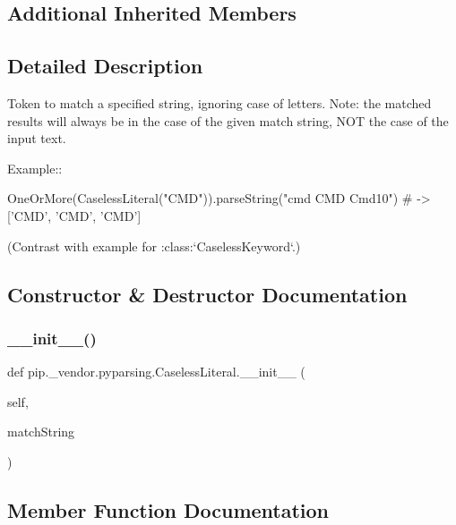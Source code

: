 \subsection*{Additional Inherited Members}


\subsection{Detailed Description}
\begin{DoxyVerb}Token to match a specified string, ignoring case of letters.
Note: the matched results will always be in the case of the given
match string, NOT the case of the input text.

Example::

    OneOrMore(CaselessLiteral("CMD")).parseString("cmd CMD Cmd10") # -> ['CMD', 'CMD', 'CMD']

(Contrast with example for :class:`CaselessKeyword`.)
\end{DoxyVerb}
 

\subsection{Constructor \& Destructor Documentation}
\mbox{\label{classpip_1_1__vendor_1_1pyparsing_1_1CaselessLiteral_a66c495156307975cc5394c6df7771d9b}} 
\subsubsection{\texorpdfstring{\+\_\+\+\_\+init\+\_\+\+\_\+()}{\_\_init\_\_()}}
{\footnotesize\ttfamily def pip.\+\_\+vendor.\+pyparsing.\+Caseless\+Literal.\+\_\+\+\_\+init\+\_\+\+\_\+ (\begin{DoxyParamCaption}\item[{}]{self,  }\item[{}]{match\+String }\end{DoxyParamCaption})}



\subsection{Member Function Documentation}
\mbox{\label{classpip_1_1__vendor_1_1pyparsing_1_1CaselessLiteral_a77c342490006ea06ae9650e9479812cd}} 
